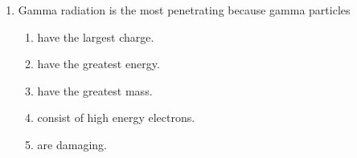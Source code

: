 \documentclass[main.tex]{subfiles}
\begin{document}
\begin{multicols*}{2}
\begin{enumerate}
\item Gamma radiation is the most penetrating because gamma particles	
\begin{enumerate}[label=(\alph*)]
\item have the largest charge.
\item have the greatest energy.
\item have the greatest mass.
\item consist of high energy electrons.
\item are damaging.
\end{enumerate}

\restoregeometry
\end{enumerate}
\end{multicols*}
\pagecolor{green!10}\afterpage{\nopagecolor}\newpage
\end{document}
